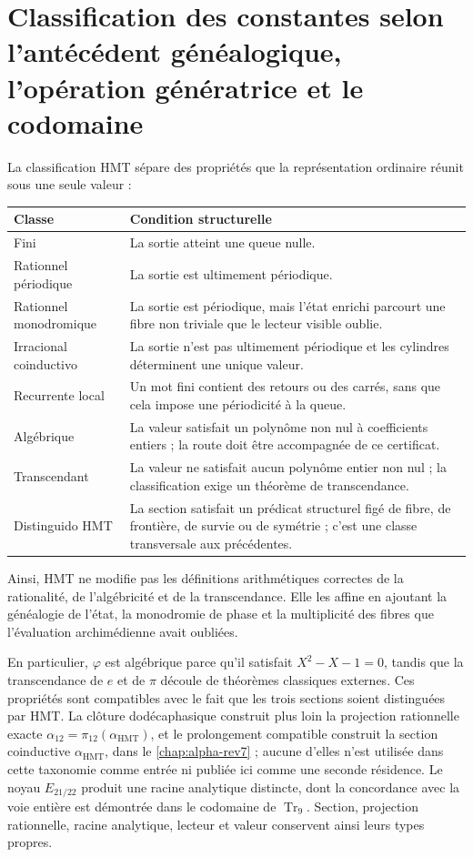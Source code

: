 \section{Classification des constantes selon l’antécédent généalogique, l’opération génératrice et le codomaine}

La classification HMT sépare des propriétés que la représentation ordinaire
réunit sous une seule valeur :
\begin{center}
\begin{tabular}{p{}p{}}
\toprule
Classe & Condition structurelle \\
\midrule
Fini & La sortie atteint une queue nulle. \\
Rationnel périodique & La sortie est ultimement périodique. \\
Rationnel monodromique & La sortie est périodique, mais l’état enrichi
parcourt une fibre non triviale que le lecteur visible oublie. \\
Irracional coinductivo & La sortie n’est pas ultimement périodique et les
cylindres déterminent une unique valeur. \\
Recurrente local & Un mot fini contient des retours ou des carrés, sans que
cela impose une périodicité à la queue. \\
Algébrique & La valeur satisfait un polynôme non nul à coefficients entiers ;
la route doit être accompagnée de ce certificat. \\
Transcendant & La valeur ne satisfait aucun polynôme entier non nul ; la
classification exige un théorème de transcendance. \\
Distinguido HMT & La section satisfait un prédicat structurel figé de
fibre, de frontière, de survie ou de symétrie ; c’est une classe transversale aux
précédentes. \\
\bottomrule
\end{tabular}
\end{center}

Ainsi, HMT ne modifie pas les définitions arithmétiques correctes de la rationalité,
de l’algébricité et de la transcendance. Elle les affine en ajoutant la généalogie de l’état,
la monodromie de phase et la multiplicité des fibres que l’évaluation
archimédienne avait oubliées.

En particulier, \(\varphi\) est algébrique parce qu’il satisfait
\(X^2-X-1=0\), tandis que la transcendance de \(e\) et de \(\pi\) découle de
théorèmes classiques externes. Ces propriétés sont compatibles avec le fait que les trois
sections soient distinguées par HMT\@. La clôture dodécaphasique construit plus
loin la projection rationnelle exacte
\(\alpha_{12}=\pi_{12}(\alpha_{\mathrm{HMT}})\), et le prolongement compatible
construit la section coinductive \(\alpha_{\mathrm{HMT}}\), dans le
\cref{chap:alpha-rev7} ; aucune d’elles n’est utilisée dans cette taxonomie comme entrée
ni publiée ici comme une seconde résidence. Le noyau \(E_{21/22}\)
produit une racine analytique distincte, dont la concordance avec la voie entière est
démontrée dans le codomaine de \(\operatorname{Tr}_9\). Section, projection
rationnelle, racine analytique, lecteur et valeur conservent ainsi leurs types propres.

